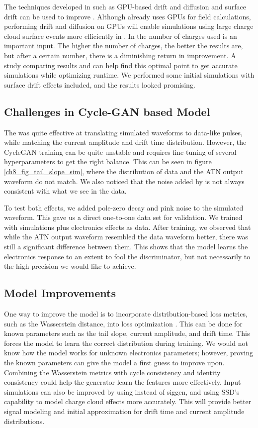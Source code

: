 The techniques developed in {\ehd} such as GPU-based drift and diffusion and surface drift can be used to improve {\ssd}. Although {\ssd} already uses GPUs for field calculations, performing drift and diffusion on GPUs will enable simulations using large charge cloud surface events more efficiently in {\ssd}. In {\ssd} the number of charges used is an important input. The higher the number of charges, the better the results are, but after a certain number, there is a diminishing return in improvement. A study comparing {\ehd} results and {\ssd} can help find this optimal point to get accurate simulations while optimizing runtime. We performed some initial {\ssd} simulations with surface drift effects included, and the results looked promising.

\subsection{Challenges in Cycle-GAN based Model}
The {\cpunet} was quite effective at translating simulated waveforms to data-like pulses, while matching the current amplitude and drift time distribution. However, the CycleGAN training can be quite unstable and requires fine-tuning of several hyperparameters to get the right balance. This can be seen in figure \ref{ch8_fig_tail_slope_sim}, where the distribution of data and the ATN output waveform do not match. We also noticed that the noise added by {\cpunet} is not always consistent with what we see in the data. 

To test both effects, we added pole-zero decay and pink noise to the simulated waveform. This gave us a direct one-to-one data set for validation. We trained {\cpunet} with simulations plus electronics effects as data. After training, we observed that while the ATN output waveform resembled the data waveform better, there was still a significant difference between them. This shows that the model learns the electronics response to an extent to fool the discriminator, but not necessarily to the high precision we would like to achieve.

\subsection{{\cpunet} Model Improvements}
One way to improve the model is to incorporate distribution-based loss metrics, such as the Wasserstein distance, into loss optimization \cite{vaserstein1969markov}. This can be done for known parameters such as the tail slope, current amplitude, and drift time. This forces the model to learn the correct distribution during training. We would not know how the model works for unknown electronics parameters; however, proving the known parameters can give the model a first guess to improve upon. Combining the Wasserstein metrics with cycle consistency and identity consistency could help the generator learn the features more effectively. Input simulations can also be improved by using {\ssd} instead of siggen, and using SSD's capability to model charge cloud effects more accurately. This will provide better signal modeling and initial approximation for drift time and current amplitude distributions.

